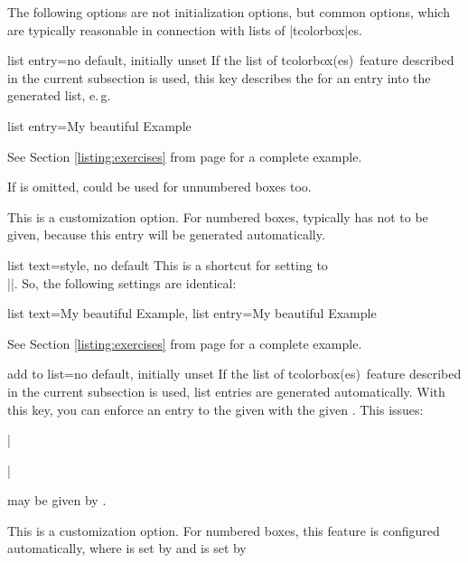 \clearpage

\begin{marker}
The following options are not initialization options, but common options,
which are typically reasonable in connection with lists of |tcolorbox|es.
\end{marker}

\begin{docTcbKey}{list entry}{=}{no default, initially unset}
If the \flqq list of tcolorbox(es)\frqq\ feature described in
the current subsection
is used, this key
describes the  for an entry into the generated list, e.\,g.
\begin{dispListing}
list entry={\protect\numberline{\thetcbcounter}My beautiful Example}
\end{dispListing}
See Section \ref{listing:exercises} from page \pageref{listing:exercises}
for a complete example.\par
If  is omitted,  could be used for
unnumbered boxes too.
\begin{marker}
This is a customization option. For numbered boxes, 
typically has not to be given, because this entry will be generated automatically.
\end{marker}
\end{docTcbKey}

\begin{docTcbKey}[][doc new=2014-09-19]{list text}{=}{style, no default}
This is a shortcut for setting  to\\
|\protect\numberline{\thetcbcounter}|.
So, the following settings are identical:
\begin{dispListing}
list text={My beautiful Example},
list entry={\protect\numberline{\thetcbcounter}My beautiful Example}
\end{dispListing}
See Section \ref{listing:exercises} from page \pageref{listing:exercises}
for a complete example.
\end{docTcbKey}

\begin{docTcbKey}{add to list}{=}{no default, initially unset}
If the \flqq list of tcolorbox(es)\frqq\ feature described in
the current subsection
is used, list entries are
generated automatically. With this key, you can enforce an entry to the
given  with the given .
This issues:\par
|\addcontentsline|\par
{} may be given by .
\begin{marker}
This is a customization option. For numbered boxes, this feature is configured
automatically, where
 is set by  and
 is set by 
\end{marker}
\end{docTcbKey}


